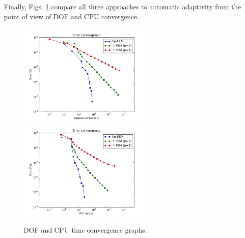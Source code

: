 Finally, Figs. \ref{fig:nist-1-conv} compare all
three approaches to automatic adaptivity from the point
of view of DOF and CPU convergence.

\begin{figure}[!ht]
\centering
\includegraphics[height=5cm]{nist/nist-1/conv_dof_aniso.png}\ \
\includegraphics[height=5cm]{nist/nist-1/conv_cpu_aniso.png}
\caption{DOF and CPU time convergence graphs.}
\label{fig:nist-1-conv}
\end{figure}
